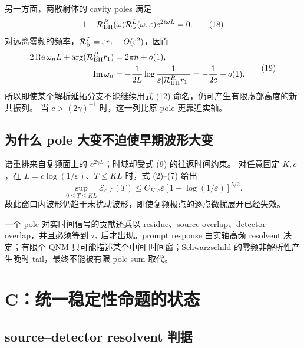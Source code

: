 \documentclass[UTF8,11pt,a4paper]{ctexart}
\theoremstyle{definition}
\newcommand{\E}{\mathcal E}
\newcommand{\eps}{\varepsilon}
\newcommand{\om}{\omega}
\begin{document}
另一方面，两散射体的 cavity poles 满足
\begin{equation}
1-\mathcal R_{\rm BH}^{R}(\om)\mathcal R_{\rm b}^{L}(\om,\eps)
e^{2i\om L}=0.                                             \tag{18}
\end{equation}
对远离零频的频率，$\mathcal R_{\rm b}^{L}=\eps r_1+O(\eps^2)$，因而
\begin{equation}
\begin{aligned}
2\operatorname{Re}\om_nL+\arg(\mathcal R_{\rm BH}^{R}r_1)&=2\pi n+o(1),\\
\operatorname{Im}\om_n&=-\frac{1}{2L}\log\frac1{\eps|\mathcal R_{\rm BH}^{R}r_1|}
=-\frac1{2c}+o(1).
\end{aligned}                                               \tag{19}
\end{equation}
所以即使某个解析延拓分支不能继续用式 (12) 命名，仍可产生有限虚部高度的新共振列。
当 $c>(2\gamma)^{-1}$ 时，这一列比原 pole 更靠近实轴。

\subsection{为什么 pole 大变不迫使早期波形大变}

谱重排来自复频面上的 $e^{2\gamma L}$；时域却受式 (9) 的往返时间约束。
对任意固定 $K,c$，在 $L=c\log(1/\eps)$、$T\le KL$ 时，式 (2)--(7) 给出
\begin{equation}
\sup_{0\le T\le KL}\E_{\eps,L}(T)
\le C_{K,c}\eps[1+\log(1/\eps)]^{5/2}.                    \tag{20}
\end{equation}
故此窗口内波形仍趋于未扰动波形，即使复频极点的逐点微扰展开已经失效。

一个 pole 对实时间信号的贡献还乘以 residue、source overlap、detector overlap，并且必须等到
$\tau_*$ 后才出现。prompt response 由实轴高频 resolvent 决定；有限个 QNM 只可能描述某个中间
时间窗；Schwarzschild 的零频非解析性产生晚时 tail，最终不能被有限 pole sum 取代。

\section{C：统一稳定性命题的状态}

\subsection{source--detector resolvent 判据}
\end{document}
